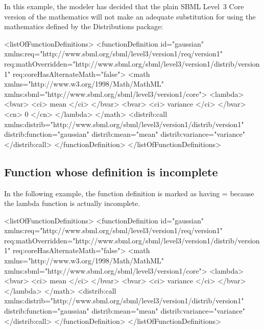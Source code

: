 In this example, the modeler has decided that the plain SBML Level~3 Core version of the mathematics will not make an adequate substitution for using the mathematics defined by the Distributions package:

\begin{example}
<listOfFunctionDefinitions> 
  <functionDefinition id="gaussian" 
                      xmlns:req="http://www.sbml.org/sbml/level3/version1/req/version1"
                      req:mathOverridden="http://www.sbml.org/sbml/level3/version1/distrib/version1" 
                      req:coreHasAlternateMath="false"> 
    <math xmlns="http://www.w3.org/1998/Math/MathML" 
          xmlns:sbml="http://www.sbml.org/sbml/level3/version1/core"> 
       <lambda>
         <bvar> <ci> mean </ci> </bvar>
         <bvar> <ci> variance </ci> </bvar>
         <cn> 0 </cn>
       </lambda>
    </math> 
    <distrib:call xmlns:distrib="http://www.sbml.org/sbml/level3/version1/distrib/version1"    
                  distrib:function="gaussian" distrib:mean="mean" distrib:variance="variance"
    </distrib:call> 
  </functionDefinition> 
</listOfFunctionDefinitions> 
\end{example} 


\subsection{Function whose definition is incomplete}

In the following example, the function definition is marked as having = because the lambda function is actually incomplete.

\begin{example}
<listOfFunctionDefinitions> 
  <functionDefinition id="gaussian" 
                      xmlns:req="http://www.sbml.org/sbml/level3/version1/req/version1"
                      req:mathOverridden="http://www.sbml.org/sbml/level3/version1/distrib/version1" 
                      req:coreHasAlternateMath="false"> 
    <math xmlns="http://www.w3.org/1998/Math/MathML" 
          xmlns:sbml="http://www.sbml.org/sbml/level3/version1/core"> 
      <lambda>
        <bvar> <ci> mean </ci> </bvar>
        <bvar> <ci> variance </ci> </bvar>
      </lambda>
    </math> 
    <distrib:call xmlns:distrib="http://www.sbml.org/sbml/level3/version1/distrib/version1"    
                  distrib:function="gaussian" distrib:mean="mean" distrib:variance="variance"
    </distrib:call> 
  </functionDefinition> 
</listOfFunctionDefinitions> 
\end{example}
